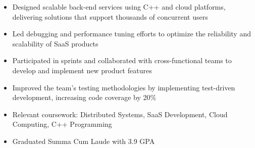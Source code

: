 \par\smallskip
\begin{minipage}{13.75cm}
  \begin{minipage}{6.5cm}
    \begin{itemize}
      \item Designed scalable back-end services using C++ and cloud platforms, delivering solutions that support thousands of concurrent users
      \item Led debugging and performance tuning efforts to optimize the reliability and scalability of SaaS products
    \end{itemize}
  \end{minipage}
  \hfill
  \begin{minipage}{6.5cm}
    \begin{itemize}
      \item Participated in sprints and collaborated with cross-functional teams to develop and implement new product features
      \item Improved the team's testing methodologies by implementing test-driven development, increasing code coverage by 20\%
    \end{itemize}
  \end{minipage}
\end{minipage}

\par\bigskip
{}
\begin{itemize}
  \item Relevant coursework: Distributed Systems, SaaS Development, Cloud Computing, C++ Programming
\end{itemize}
\divider

\begin{itemize}
  \item Graduated Summa Cum Laude with 3.9 GPA
\end{itemize}



